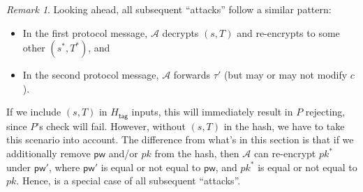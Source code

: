 \documentclass{article}
\theoremstyle{plain}
\theoremstyle{definition}
\theoremstyle{remark}
\newtheorem{remark}{Remark}
\newcommand{\adv}{\mathcal{A}}
\newcommand{\Htag}{H_\mathsf{tag}}
\newcommand{\pw}{\mathsf{pw}}
\begin{document}
\begin{remark}
Looking ahead, all subsequent ``attacks'' follow a similar pattern:
\begin{itemize}
  \item In the first protocol message, $\adv$ decrypts $(s,T)$ and re-encrypts to some other $(s^*,T^*)$, and
  \item In the second protocol message, $\adv$ forwards $\tau'$ (but may or may not modify $c$).
\end{itemize}
If we include $(s,T)$ in $\Htag$ inputs, this will immediately result in $P$ rejecting, since $P$'s check will fail. However, without $(s,T)$ in the hash, we have to take this scenario into account. The difference from what's in this section is that if we additionally remove $\pw$ and/or $pk$ from the hash, then $\adv$ can re-encrypt $pk^*$ under $\pw'$, where $\pw'$ is equal or not equal to $\pw$, and $pk^*$ is equal or not equal to $pk$. Hence,  is a special case of all subsequent ``attacks''.
\end{remark}
\end{document}
